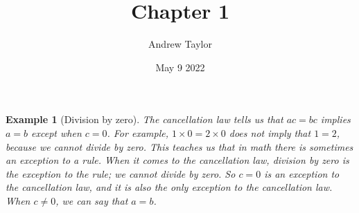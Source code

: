 \documentclass{article}
\title{Chapter 1}
\author{Andrew Taylor}
\date{May 9 2022}
\newtheorem{example}{Example}
\begin{document}
\maketitle

\begin{example}[Division by zero] 
The cancellation law tells us that $ac = bc$ implies $a = b$ except when $c = 0$. For example, $1 \times 0 = 2 \times 0$ does not imply that $1 = 2$, because we cannot divide by zero. This teaches us that in math there is sometimes an exception to a rule. When it comes to the cancellation law, division by zero is the exception to the rule; we cannot divide by zero. So $c = 0$ is an exception to the cancellation law, and it is also the only exception to the cancellation law. When $c \neq 0$, we can say that $a = b$.
\end{example}
\end{document}
